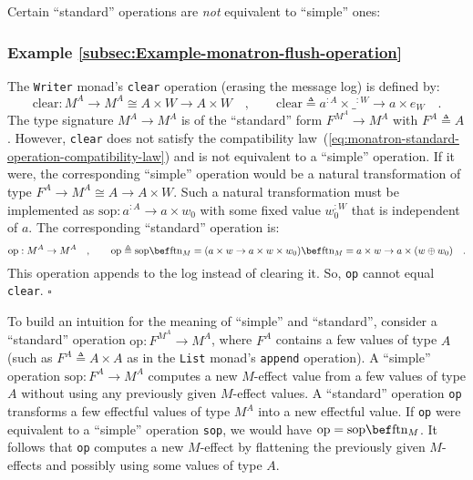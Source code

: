 Certain \textsf{``}standard\textsf{''} operations are \emph{not} equivalent to \textsf{``}simple\textsf{''}
ones:

\subsubsection{Example \label{subsec:Example-monatron-flush-operation}\ref{subsec:Example-monatron-flush-operation}}

The \lstinline!Writer! monad\textsf{'}s \lstinline!clear! operation (erasing
the message log) is defined by:
\[
\text{clear}:M^{A}\rightarrow M^{A}\cong A\times W\rightarrow A\times W\quad,\quad\quad\text{clear}\triangleq a^{:A}\times\_^{:W}\rightarrow a\times e_{W}\quad.
\]
The type signature $M^{A}\rightarrow M^{A}$ is of the \textsf{``}standard\textsf{''}
form $F^{M^{A}}\rightarrow M^{A}$ with $F^{A}\triangleq A$. However,
\lstinline!clear! does not satisfy the compatibility law~(\ref{eq:monatron-standard-operation-compatibility-law})
and is not equivalent to a \textsf{``}simple\textsf{''} operation. If it were, the
corresponding \textsf{``}simple\textsf{''} operation would be a natural transformation
of type $F^{A}\rightarrow M^{A}\cong A\rightarrow A\times W$. Such
a natural transformation must be implemented as $\text{sop}:a^{:A}\rightarrow a\times w_{0}$
with some fixed value $w_{0}^{:W}$ that is independent of $a$. The
corresponding \textsf{``}standard\textsf{''} operation is:
\[
\text{op}:M^{A}\rightarrow M^{A}\quad,\quad\quad\text{op}\triangleq\text{sop}\bef\text{ftn}_{M}=(a\times w\rightarrow a\times w\times w_{0})\bef\text{ftn}_{M}=a\times w\rightarrow a\times(w\oplus w_{0})\quad.
\]
This operation appends to the log instead of clearing it. So, \lstinline!op!
cannot equal \lstinline!clear!. $\square$

To build an intuition for the meaning of \textsf{``}simple\textsf{''} and \textsf{``}standard\textsf{''},
consider a \textsf{``}standard\textsf{''} operation $\text{op}:F^{M^{A}}\rightarrow M^{A}$,
where $F^{A}$ contains a few values of type $A$ (such as $F^{A}\triangleq A\times A$
as in the \lstinline!List! monad\textsf{'}s \lstinline!append! operation).
A \textsf{``}simple\textsf{''} operation $\text{sop}:F^{A}\rightarrow M^{A}$ computes
a new $M$-effect value from a few values of type $A$ without using
any previously given $M$-effect values. A \textsf{``}standard\textsf{''} operation
\lstinline!op! transforms a few effectful values of type $M^{A}$
into a new effectful value. If \lstinline!op! were equivalent to
a \textsf{``}simple\textsf{''} operation \lstinline!sop!, we would have $\text{op}=\text{sop}\bef\text{ftn}_{M}$.
It follows that \lstinline!op! computes a new $M$-effect by flattening
the previously given $M$-effects and possibly using some values of
type $A$. 

